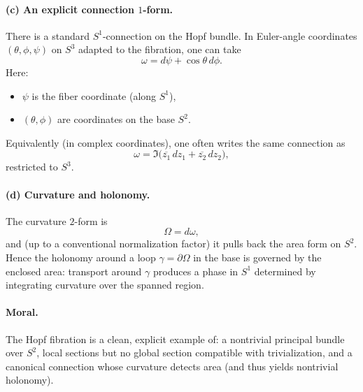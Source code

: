 \documentclass[12pt,a4paper]{article}
\theoremstyle{plain}
\theoremstyle{definition}      %
\begin{document}
\paragraph{(c) An explicit connection $1$-form.}
There is a standard $S^1$-connection on the Hopf bundle.
In Euler-angle coordinates $(\theta,\phi,\psi)$ on $S^3$ adapted to the fibration, one can take
\[
\omega = d\psi + \cos\theta\, d\phi.
\]
Here:
\begin{itemize}
	\item $\psi$ is the fiber coordinate (along $S^1$),
	\item $(\theta,\phi)$ are coordinates on the base $S^2$.
\end{itemize}

Equivalently (in complex coordinates), one often writes the same connection as
\[
\omega = \Im\!\bigl(\overline{z_1}\,dz_1+\overline{z_2}\,dz_2\bigr),
\]
restricted to $S^3$.

\paragraph{(d) Curvature and holonomy.}
The curvature $2$-form is
\[
\Omega = d\omega,
\]
and (up to a conventional normalization factor) it pulls back the area form on $S^2$.
Hence the holonomy around a loop $\gamma=\partial\Omega$ in the base is governed by the enclosed area:
transport around $\gamma$ produces a phase in $S^1$ determined by integrating curvature over the spanned region.

\paragraph{Moral.}
The Hopf fibration is a clean, explicit example of:
a nontrivial principal bundle over $S^2$,
local sections but no global section compatible with trivialization,
and a canonical connection whose curvature detects area (and thus yields nontrivial holonomy).


	
\end{document}
